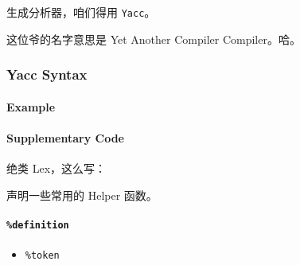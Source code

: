\documentclass[
]{article}
\newenvironment{Shaded}{}{}
\newcommand{\BaseNTok}[1]{\textcolor[rgb]{0.25,0.63,0.44}{#1}}
\newcommand{\DataTypeTok}[1]{\textcolor[rgb]{0.56,0.13,0.00}{#1}}
\newcommand{\NormalTok}[1]{#1}
\begin{document}
生成分析器，咱们得用 \texttt{Yacc}。

这位爷的名字意思是 Yet Another Compiler Compiler。哈。

\hypertarget{header-n42}{%
\subsubsection{Yacc Syntax}\label{header-n42}}

\hypertarget{header-n43}{%
\paragraph{Example}\label{header-n43}}

\begin{Shaded}
\end{Shaded}

\hypertarget{header-n45}{%
\paragraph{Supplementary Code}\label{header-n45}}

绝类 Lex，这么写：

\begin{Shaded}
\end{Shaded}

声明一些常用的 Helper 函数。

\hypertarget{header-n49}{%
\paragraph{\texorpdfstring{\texttt{\%definition}}{\%definition}}\label{header-n49}}

\begin{itemize}
\item
  \texttt{\%token}
\end{itemize}
\end{document}
